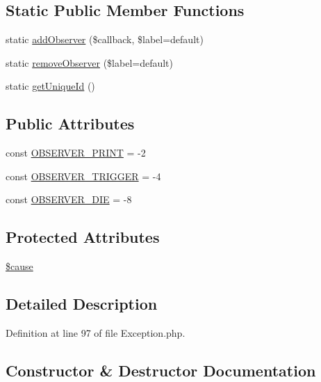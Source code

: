 \subsection*{Static Public Member Functions}
\begin{DoxyCompactItemize}
\item 
static \hyperlink{classPEAR__Exception_acedbec58339dbeacc5bcfeaa6dbc44b7}{add\+Observer} (\$callback, \$label=\textquotesingle{}default\textquotesingle{})
\item 
static \hyperlink{classPEAR__Exception_ac5a5c181030c19d81f280ab8190b5909}{remove\+Observer} (\$label=\textquotesingle{}default\textquotesingle{})
\item 
static \hyperlink{classPEAR__Exception_af81b4e556fe7142e45ed9117b8cfb044}{get\+Unique\+Id} ()
\end{DoxyCompactItemize}
\subsection*{Public Attributes}
\begin{DoxyCompactItemize}
\item 
const \hyperlink{classPEAR__Exception_afaa71d35f3fab453da2cef325b210423}{O\+B\+S\+E\+R\+V\+E\+R\+\_\+\+P\+R\+I\+NT} = -\/2
\item 
const \hyperlink{classPEAR__Exception_a0bf6d43a80c7f3bc2c7cfae062ff4477}{O\+B\+S\+E\+R\+V\+E\+R\+\_\+\+T\+R\+I\+G\+G\+ER} = -\/4
\item 
const \hyperlink{classPEAR__Exception_ad3ee7214450c1e14de99dbde12b8a60c}{O\+B\+S\+E\+R\+V\+E\+R\+\_\+\+D\+IE} = -\/8
\end{DoxyCompactItemize}
\subsection*{Protected Attributes}
\begin{DoxyCompactItemize}
\item 
\hyperlink{classPEAR__Exception_a7570906af734c282bcde649449bdbfdb}{\$cause}
\end{DoxyCompactItemize}


\subsection{Detailed Description}


Definition at line 97 of file Exception.\+php.



\subsection{Constructor \& Destructor Documentation}
\hypertarget{classPEAR__Exception_a7cecb146f11821bcd31ef8317c9a2ce9}{}\label{classPEAR__Exception_a7cecb146f11821bcd31ef8317c9a2ce9} 
